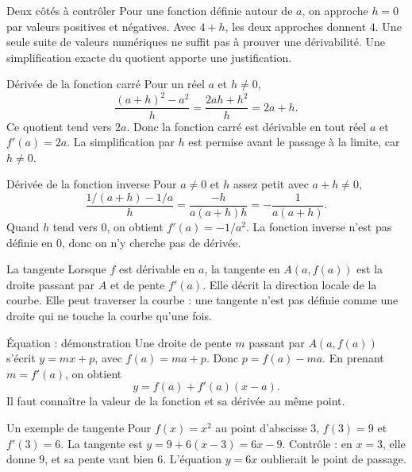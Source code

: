 \documentclass[aspectratio=169,12pt]{beamer}
\begin{document}
\renewcommand{\slidekind}{À RETENIR}
\begin{frame}[t,fragile]{Deux côtés à contrôler}
Pour une fonction définie autour de $a$, on approche $h=0$ par valeurs positives et négatives. Avec $4+h$, les deux approches donnent $4$. Une seule suite de valeurs numériques ne suffit pas à prouver une dérivabilité. Une simplification exacte du quotient apporte une justification.
\end{frame}
\renewcommand{\slidekind}{COMPRENDRE}
\begin{frame}[t,fragile]{Dérivée de la fonction carré}
Pour un réel $a$ et $h\ne0$, \[\frac{(a+h)^2-a^2}{h}=\frac{2ah+h^2}{h}=2a+h.\] Ce quotient tend vers $2a$. Donc la fonction carré est dérivable en tout réel $a$ et $f\prime(a)=2a$. La simplification par $h$ est permise avant le passage à la limite, car $h\ne0$.
\end{frame}
\renewcommand{\slidekind}{COMPRENDRE}
\begin{frame}[t,fragile]{Dérivée de la fonction inverse}
Pour $a\ne0$ et $h$ assez petit avec $a+h\ne0$, \[\frac{1/(a+h)-1/a}{h}=\frac{-h}{a(a+h)h}=-\frac1{a(a+h)}.\] Quand $h$ tend vers $0$, on obtient $f\prime(a)=-1/a^2$. La fonction inverse n’est pas définie en $0$, donc on n’y cherche pas de dérivée.
\end{frame}
\renewcommand{\slidekind}{COMPRENDRE}
\begin{frame}[t,fragile]{La tangente}
Lorsque $f$ est dérivable en $a$, la tangente en $A(a,f(a))$ est la droite passant par $A$ et de pente $f\prime(a)$. Elle décrit la direction locale de la courbe. Elle peut traverser la courbe : une tangente n’est pas définie comme une droite qui ne touche la courbe qu’une fois.
\end{frame}
\renewcommand{\slidekind}{MÉTHODE \& EXEMPLE}
\begin{frame}[t,fragile]{Équation : démonstration}
Une droite de pente $m$ passant par $A(a,f(a))$ s’écrit $y=mx+p$, avec $f(a)=ma+p$. Donc $p=f(a)-ma$. En prenant $m=f\prime(a)$, on obtient \[y=f(a)+f\prime(a)(x-a).\] Il faut connaître la valeur de la fonction et sa dérivée au même point.
\end{frame}
\renewcommand{\slidekind}{MÉTHODE \& EXEMPLE}
\begin{frame}[t,fragile]{Un exemple de tangente}
Pour $f(x)=x^2$ au point d’abscisse $3$, $f(3)=9$ et $f\prime(3)=6$. La tangente est $y=9+6(x-3)=6x-9$. Contrôle : en $x=3$, elle donne $9$, et sa pente vaut bien $6$. L’équation $y=6x$ oublierait le point de passage.
\end{frame}
\end{document}
